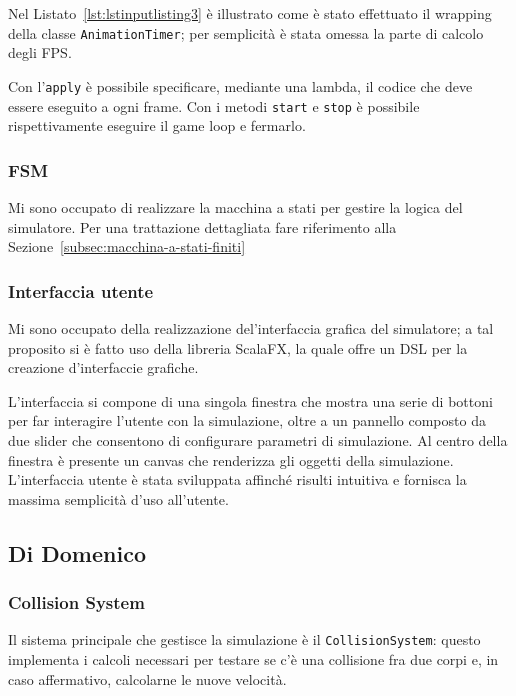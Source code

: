 Nel Listato~\ref{lst:lstinputlisting3} è illustrato come è stato effettuato il wrapping della classe
\texttt{AnimationTimer}; per semplicità è stata omessa la parte di calcolo degli FPS\@.



Con l'\texttt{apply} è possibile specificare, mediante una lambda, il codice che deve essere eseguito a ogni
frame.
Con i metodi \texttt{start} e \texttt{stop} è possibile rispettivamente eseguire il game loop e fermarlo.

\subsubsection{FSM}
Mi sono occupato di realizzare la macchina a stati per gestire la logica del simulatore.
Per una trattazione dettagliata fare riferimento alla Sezione~\ref{subsec:macchina-a-stati-finiti}

\subsubsection{Interfaccia utente}
Mi sono occupato della realizzazione del'interfaccia grafica del simulatore;
a tal proposito si è fatto uso della libreria ScalaFX, la quale offre un DSL per la creazione d'interfaccie grafiche.

L'interfaccia si compone di una singola finestra che mostra una serie di bottoni per far interagire l'utente con la
simulazione, oltre a un pannello composto da due slider che consentono di configurare parametri di simulazione.
Al centro della finestra è presente un canvas che renderizza gli oggetti della simulazione.
L'interfaccia utente è stata sviluppata affinché risulti intuitiva e fornisca la massima semplicità d'uso all'utente.

\subsection{Di Domenico}\label{subsec:demo-di-domenico}

\subsubsection{Collision System}\label{subsubsec:container}
Il sistema principale che gestisce la simulazione è il \texttt{CollisionSystem}: questo implementa i calcoli necessari
per testare se c'è una collisione fra due corpi e, in caso affermativo, calcolarne le nuove velocità.

